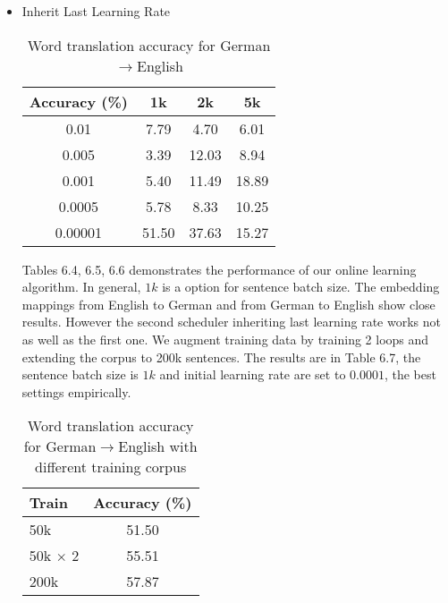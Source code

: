 \begin{itemize}
\begin{table}[h]
		\end{table}	
%
%		
	\item Inherit Last Learning Rate
		\begin{table}[H]
			\centering
			\caption{Word translation accuracy for German$\rightarrow$English}
			\begin{tabular}{cccc}
				\hline
				Accuracy (\%) & 1k   & 2k   & 5k      \\ \hline
				0.01          & 7.79  & 4.70  & 6.01 \\ \hline
				0.005       & 3.39 & 12.03 & 8.94 \\ \hline
				0.001        & 5.40 & 11.49 & 18.89 \\ \hline
				0.0005          & 5.78  & 8.33  & 10.25 \\ \hline
				0.00001        & 51.50 & 37.63 & 15.27 \\ \hline
			\end{tabular}

		\end{table}	

Tables 6.4, 6.5, 6.6 demonstrates the performance of our online learning algorithm. In general, $1k$ is a option for sentence batch size. The embedding mappings from English to German and from German to English show close results.
However the second scheduler inheriting last learning rate works not as well as the first one. We augment training data by training 2 loops and extending the corpus to 200k sentences. The results are in Table 6.7, the sentence batch size is $1k$ and initial learning rate are set to $0.0001$, the best settings empirically.

		\begin{table}[H]
			\centering
				\caption{ Word translation accuracy for German$\rightarrow$English with different training corpus}
			\begin{tabular}{lc}
				\hline
				Train & Accuracy (\%) \\ \hline
				50k   & 51.50         \\ \hline
				50k $\times$ 2 & 55.51         \\ \hline
				200k  & 57.87         \\ \hline
			\end{tabular}
			
		\end{table}
\end{itemize}
